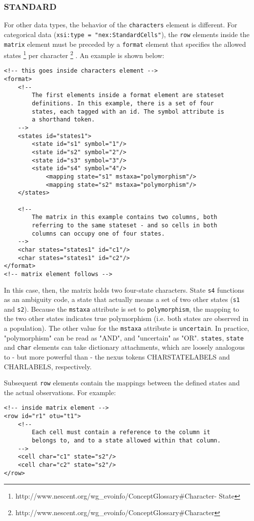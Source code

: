 \documentclass{article}
\newcommand{\code}{\texttt} \usepackage{fullpage}
\begin{document}
\subsubsection{STANDARD} For other data types, the behavior of the
\code{characters} element is different. For categorical data
(\code{xsi:type = "nex:StandardCells"}), the \code{row} elements inside
the \code{matrix} element must be preceded by a \code{format} element
that specifies the allowed states
\footnote{http://www.nescent.org/wg\_evoinfo/ConceptGlossary\#Character-
State} per character
\footnote{http://www.nescent.org/wg\_evoinfo/ConceptGlossary\#Character}
. An example is shown below: 
\begin{verbatim} 
<!-- this goes inside characters element -->  
<format> 
    <!-- 
        The first elements inside a format element are stateset 
        definitions. In this example, there is a set of four 
        states, each tagged with an id. The symbol attribute is 
        a shorthand token. 
    --> 
    <states id="states1"> 
        <state id="s1" symbol="1"/>
        <state id="s2" symbol="2"/> 
        <state id="s3" symbol="3"/> 
        <state id="s4" symbol="4"/> 
            <mapping state="s1" mstaxa="polymorphism"/> 
            <mapping state="s2" mstaxa="polymorphism"/> 
    </states>
    
    <!-- 
        The matrix in this example contains two columns, both 
        referring to the same stateset - and so cells in both 
        columns can occupy one of four states. 
    --> 
    <char states="states1" id="c1"/> 
    <char states="states1" id="c2"/> 
</format>
<!-- matrix element follows --> 
\end{verbatim}

In this case, then, the matrix holds two four-state characters. State
\code{s4} functions as an ambiguity code, a state that actually means a
set of two other states (\code{s1} and \code{s2}). Because the
\code{mstaxa} attribute is set to \code{polymorphism}, the mapping to
the two other states indicates true polymorphism (i.e. both states are
observed in a population). The other value for the \code{mstaxa}
attribute is \code{uncertain}. In practice, "polymorphism" can be read
as "AND", and "uncertain" as "OR". \code{states}, \code{state} and
\code{char}  elements can take dictionary attachments, which are loosely
analogous to - but more powerful than - the nexus tokens CHARSTATELABELS
and CHARLABELS, respectively.

Subsequent \code{row} elements contain the mappings between the defined
states and the actual observations. For example: 
\begin{verbatim} 
<!-- inside matrix element --> 
<row id="r1" otu="t1"> 
    <!-- 
        Each cell must contain a reference to the column it
        belongs to, and to a state allowed within that column. 
    --> 
    <cell char="c1" state="s2"/> 
    <cell char="c2" state="s2"/> 
</row>
\end{verbatim}
\end{document}

